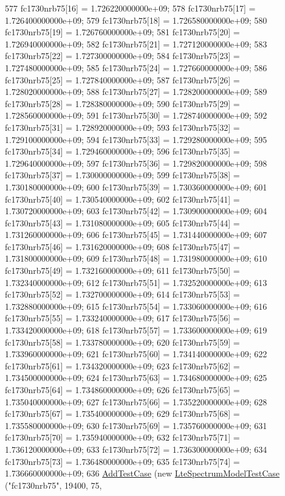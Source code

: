 \begin{DoxyCode}
577   fc1730nrb75[16] = 1.726220000000e+09;
578   fc1730nrb75[17] = 1.726400000000e+09;
579   fc1730nrb75[18] = 1.726580000000e+09;
580   fc1730nrb75[19] = 1.726760000000e+09;
581   fc1730nrb75[20] = 1.726940000000e+09;
582   fc1730nrb75[21] = 1.727120000000e+09;
583   fc1730nrb75[22] = 1.727300000000e+09;
584   fc1730nrb75[23] = 1.727480000000e+09;
585   fc1730nrb75[24] = 1.727660000000e+09;
586   fc1730nrb75[25] = 1.727840000000e+09;
587   fc1730nrb75[26] = 1.728020000000e+09;
588   fc1730nrb75[27] = 1.728200000000e+09;
589   fc1730nrb75[28] = 1.728380000000e+09;
590   fc1730nrb75[29] = 1.728560000000e+09;
591   fc1730nrb75[30] = 1.728740000000e+09;
592   fc1730nrb75[31] = 1.728920000000e+09;
593   fc1730nrb75[32] = 1.729100000000e+09;
594   fc1730nrb75[33] = 1.729280000000e+09;
595   fc1730nrb75[34] = 1.729460000000e+09;
596   fc1730nrb75[35] = 1.729640000000e+09;
597   fc1730nrb75[36] = 1.729820000000e+09;
598   fc1730nrb75[37] = 1.730000000000e+09;
599   fc1730nrb75[38] = 1.730180000000e+09;
600   fc1730nrb75[39] = 1.730360000000e+09;
601   fc1730nrb75[40] = 1.730540000000e+09;
602   fc1730nrb75[41] = 1.730720000000e+09;
603   fc1730nrb75[42] = 1.730900000000e+09;
604   fc1730nrb75[43] = 1.731080000000e+09;
605   fc1730nrb75[44] = 1.731260000000e+09;
606   fc1730nrb75[45] = 1.731440000000e+09;
607   fc1730nrb75[46] = 1.731620000000e+09;
608   fc1730nrb75[47] = 1.731800000000e+09;
609   fc1730nrb75[48] = 1.731980000000e+09;
610   fc1730nrb75[49] = 1.732160000000e+09;
611   fc1730nrb75[50] = 1.732340000000e+09;
612   fc1730nrb75[51] = 1.732520000000e+09;
613   fc1730nrb75[52] = 1.732700000000e+09;
614   fc1730nrb75[53] = 1.732880000000e+09;
615   fc1730nrb75[54] = 1.733060000000e+09;
616   fc1730nrb75[55] = 1.733240000000e+09;
617   fc1730nrb75[56] = 1.733420000000e+09;
618   fc1730nrb75[57] = 1.733600000000e+09;
619   fc1730nrb75[58] = 1.733780000000e+09;
620   fc1730nrb75[59] = 1.733960000000e+09;
621   fc1730nrb75[60] = 1.734140000000e+09;
622   fc1730nrb75[61] = 1.734320000000e+09;
623   fc1730nrb75[62] = 1.734500000000e+09;
624   fc1730nrb75[63] = 1.734680000000e+09;
625   fc1730nrb75[64] = 1.734860000000e+09;
626   fc1730nrb75[65] = 1.735040000000e+09;
627   fc1730nrb75[66] = 1.735220000000e+09;
628   fc1730nrb75[67] = 1.735400000000e+09;
629   fc1730nrb75[68] = 1.735580000000e+09;
630   fc1730nrb75[69] = 1.735760000000e+09;
631   fc1730nrb75[70] = 1.735940000000e+09;
632   fc1730nrb75[71] = 1.736120000000e+09;
633   fc1730nrb75[72] = 1.736300000000e+09;
634   fc1730nrb75[73] = 1.736480000000e+09;
635   fc1730nrb75[74] = 1.736660000000e+09;
636   \hyperlink{classns3_1_1TestCase_a3718088e3eefd5d6454569d2e0ddd835}{AddTestCase} (\textcolor{keyword}{new} \hyperlink{classLteSpectrumModelTestCase}{LteSpectrumModelTestCase} (\textcolor{stringliteral}{"fc1730nrb75"}, 19400, 75, 

\end{DoxyCode}
